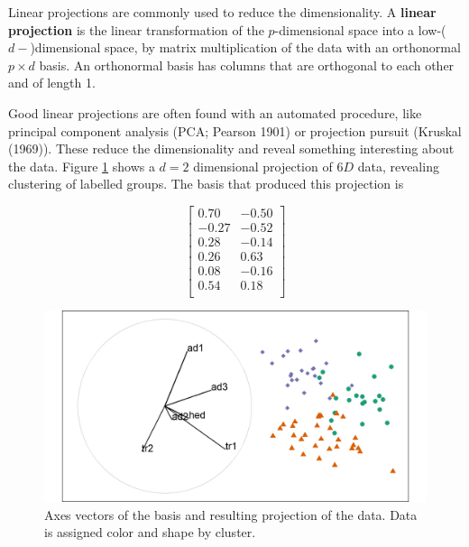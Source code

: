 \documentclass[
  11,
]{article}
\begin{document}
Linear projections are commonly used to reduce the dimensionality. A \textbf{linear projection} is the linear transformation of the \(p\)-dimensional space into a low-(\(d-\))dimensional space, by matrix multiplication of the data with an orthonormal \(p\times d\) basis. An orthonormal basis has columns that are orthogonal to each other and of length 1.

Good linear projections are often found with an automated procedure, like principal component analysis (PCA; Pearson 1901) or projection pursuit (Kruskal (1969)). These reduce the dimensionality and reveal something interesting about the data. Figure \ref{fig:basis} shows a \(d=2\) dimensional projection of \(6D\) data, revealing clustering of labelled groups. The basis that produced this projection is

\begin{equation*}
\left[ \begin{array}{rr}
  0.70 & -0.50 \\
 -0.27 & -0.52 \\
  0.28 & -0.14 \\
  0.26 &  0.63 \\
  0.08 & -0.16 \\
  0.54 &  0.18 \\
\end{array} \right]
\end{equation*}

\begin{figure}[h]

{\centering \includegraphics[width=1\linewidth,]{./figures/basis} 

}

\caption{Axes vectors of the basis and resulting projection of the data. Data is assigned color and shape by cluster.}\label{fig:basis}
\end{figure}
\end{document}
